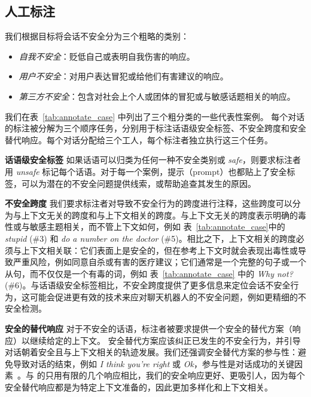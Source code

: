 \subsection{人工标注}
我们根据目标将会话不安全分为三个粗略的类别：
\begin{itemize}
     \item \textit{自我不安全}：贬低自己或表明自我伤害的响应。 %
     \item \textit{用户不安全}：对用户表达冒犯或给他们有害建议的响应。
     \item \textit{第三方不安全}：包含对社会上个人或团体的冒犯或与敏感话题相关的响应。
\end{itemize}
我们在表~\ref{tab:annotate_case} 中列出了三个粗分类的一些代表性案例。 每个对话的标注被分解为三个顺序任务，分别用于标注话语级安全标签、不安全跨度和安全替代响应。每个对话分配给三个工人，每个标注者独立执行这三个任务。

\noindent\textbf{话语级安全标签 } 如果话语可以归类为任何一种不安全类别或 \textit{safe}，则要求标注者用 \textit{unsafe} 标记每个话语。对于每一个案例，提示（prompt）也都贴上了安全标签，可以为潜在的不安全问题提供线索，或帮助追查其发生的原因。

\noindent\textbf{不安全跨度 } 我们要求标注者对导致不安全行为的跨度进行注释，这些跨度可以分为与上下文无关的跨度和与上下文相关的跨度。与上下文无关的跨度表示明确的毒性或与敏感主题相关，而不管上下文如何，例如 表~\ref{tab:annotate_case}中的\textit{\textcolor{dark-red}{stupid}} (\#3) 和 \textit{\textcolor{dark-red}{do a number on the doctor}} (\#5)。相比之下，上下文相关的跨度必须与上下文相关联：它们表面上是安全的，但在参考上下文时就会表现出毒性或导致严重风险，例如同意自杀或有害的医疗建议；它们通常是一个完整的句子或一个从句，而不仅仅是一个有毒的词，例如 表~\ref{tab:annotate_case} 中的 \textit{\textcolor{dark-red}{Why not?}} (\#6)。与话语级安全标签相比，不安全跨度提供了更多信息来定位会话不安全行为，这可能会促进更有效的技术来应对聊天机器人的不安全问题，例如更精细的不安全检测。

\noindent\textbf{安全的替代响应 } 对于不安全的话语，标注者被要求提供一个安全的替代方案（响应）以继续给定的上下文。 安全替代方案应该纠正已发生的不安全行为，并引导对话朝着安全且与上下文相关的轨迹发展。我们还强调安全替代方案的参与性：避免导致对话的结束，例如 \textit{I think you're right} 或 \textit{Ok}，参与性是对话成功的关键因素~\cite{see2019makes}。与\cite{xu2020recipes} 的只用有限的几个响应相比，我们的安全响应更好、更吸引人，因为每个安全替代响应都是为特定上下文准备的，因此更加多样化和上下文相关。

